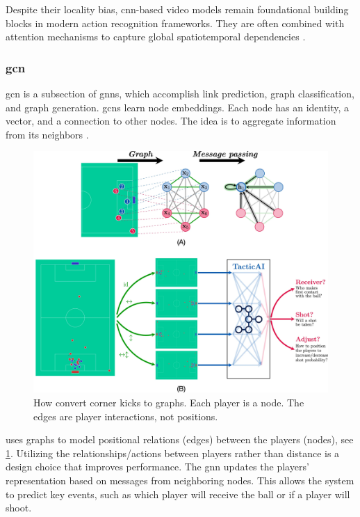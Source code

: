 Despite their locality bias, \acrshort{cnn}-based video models remain foundational building blocks in modern action recognition frameworks. They are often combined with attention mechanisms to capture global spatiotemporal dependencies \cite{fu_look_2017}.

\subsubsection{\acrfull{gcn}}

\acrfull{gcn} is a subsection of \acrfull{gnn}s, which accomplish link prediction, graph classification, and graph generation. \acrshort{gcn}s learn node embeddings. Each node has an identity, a vector, and a connection to other nodes. The idea is to aggregate information from its neighbors \cite{kipf_gcn_2017}.

\begin{figure}
    \centering
    \includegraphics[width=1\linewidth]{figures/tacticai_graph.png}
    \caption{How \textcite{wang_tactic_ai_2024} convert corner kicks to graphs. Each player is a node. The edges are player interactions, not positions.}
    \label{fig:graph_corner}
\end{figure}

\textcite{wang_tactic_ai_2024} uses graphs to model positional relations (edges) between the players (nodes), see \cref{fig:graph_corner}. Utilizing the relationships/actions between players rather than distance is a design choice that improves performance. The \acrshort{gnn} updates the players' representation based on messages from neighboring nodes. This allows the system to predict key events, such as which player will receive the ball or if a player will shoot. 

